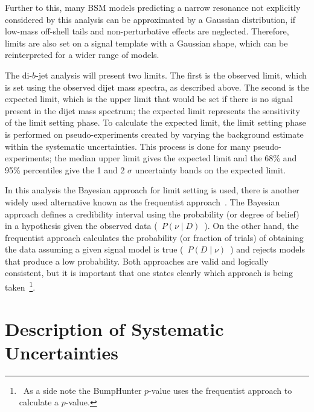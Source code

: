 Further to this, many BSM models predicting a narrow resonance
not explicitly considered by this analysis
can be approximated by a Gaussian distribution,
if low-mass off-shell tails and non-perturbative effects are neglected.
Therefore, limits are also set on a signal template with a Gaussian shape,
which can be reinterpreted for a wider range of models.
  
The di-$b$-jet analysis will present two limits.
The first is the observed limit, which is set using the observed dijet mass spectra, as described above.
The second is the expected limit, which is the upper limit that would be set if there is no signal present in the dijet mass spectrum;
the expected limit represents the sensitivity of the limit setting phase.
To calculate the expected limit, the limit setting phase is performed on pseudo-experiments
created by varying the background estimate within the systematic uncertainties.
This process is done for many pseudo-experiments; the median upper limit gives the expected limit
and the 68\% and 95\% percentiles give the 1 and 2 $\sigma$ uncertainty bands on the expected limit.

In this analysis the Bayesian approach for limit setting is used,
there is another widely used alternative known as the frequentist approach~\cite{lim-cowan}.
The Bayesian approach defines a credibility interval using the probability (or degree of belief) in a hypothesis given the observed data \mbox{( $P(\nu \mid D)$ )}.
On the other hand, the frequentist approach calculates the probability (or fraction of trials)
of obtaining the data assuming a given signal model is true \mbox{( $P(D \mid \nu)$ )} and rejects models that produce a low probability.
Both approaches are valid and logically consistent,
but it is important that one states clearly which approach is being taken~\footnote{\ As a side note the BumpHunter $p$-value uses the frequentist approach to calculate a $p$-value.}.

\section{Description of Systematic Uncertainties}
\label{sec:lim-syst}

